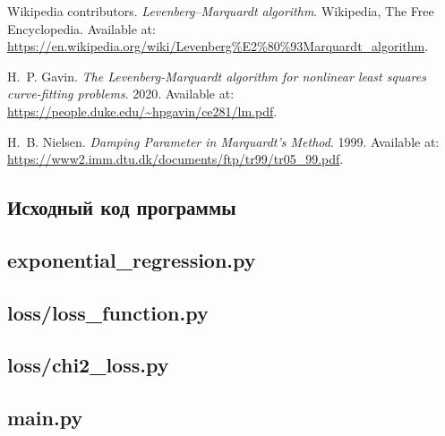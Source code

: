 \begin{thebibliography}{99}
	Wikipedia contributors.
	\emph{Levenberg--Marquardt algorithm}.
	Wikipedia, The Free Encyclopedia.
	Available at: \url{https://en.wikipedia.org/wiki/Levenberg%E2%80%93Marquardt_algorithm}.

	H.~P. Gavin.
	\emph{The Levenberg-Marquardt algorithm for nonlinear least squares curve-fitting problems}.
	2020.
	Available at: \url{https://people.duke.edu/~hpgavin/ce281/lm.pdf}.

	H.~B. Nielsen.
	\emph{Damping Parameter in Marquardt's Method}.
	1999.
	Available at: \url{https://www2.imm.dtu.dk/documents/ftp/tr99/tr05_99.pdf}.
\end{thebibliography}

\newcommand{\sectionset}{\centering\normalsize\normalfont\bfseries\expandafter\uppercase}
{}
\begin{appendices}
	\renewcommand{\thesection}{\Asbuk{section}}

	\newpage
	\section{Исходный код программы}

	\subsection{exponential\_regression.py}
	

	\newpage
	\subsection{loss/loss\_function.py}
	

	\newpage
	\subsection{loss/chi2\_loss.py}
	

	\newpage
	\subsection{main.py}
	

\end{appendices}

